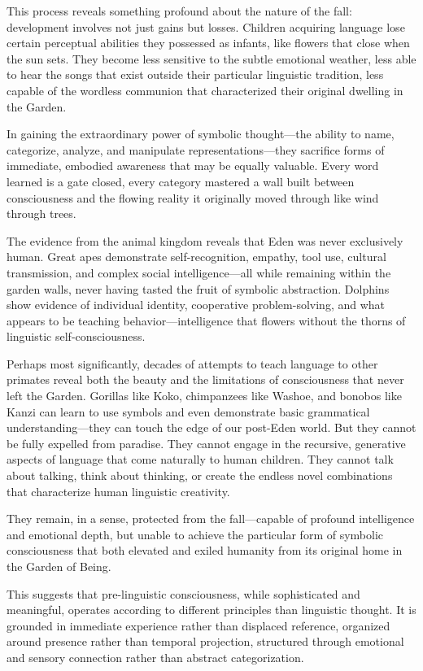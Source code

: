 This process reveals something profound about the nature of the fall: development involves not just gains but losses. Children acquiring language lose certain perceptual abilities they possessed as infants, like flowers that close when the sun sets. They become less sensitive to the subtle emotional weather, less able to hear the songs that exist outside their particular linguistic tradition, less capable of the wordless communion that characterized their original dwelling in the Garden.

In gaining the extraordinary power of symbolic thought—the ability to name, categorize, analyze, and manipulate representations—they sacrifice forms of immediate, embodied awareness that may be equally valuable. Every word learned is a gate closed, every category mastered a wall built between consciousness and the flowing reality it originally moved through like wind through trees.

The evidence from the animal kingdom reveals that Eden was never exclusively human. Great apes demonstrate self-recognition, empathy, tool use, cultural transmission, and complex social intelligence—all while remaining within the garden walls, never having tasted the fruit of symbolic abstraction. Dolphins show evidence of individual identity, cooperative problem-solving, and what appears to be teaching behavior—intelligence that flowers without the thorns of linguistic self-consciousness.

Perhaps most significantly, decades of attempts to teach language to other primates reveal both the beauty and the limitations of consciousness that never left the Garden. Gorillas like Koko, chimpanzees like Washoe, and bonobos like Kanzi can learn to use symbols and even demonstrate basic grammatical understanding—they can touch the edge of our post-Eden world. But they cannot be fully expelled from paradise. They cannot engage in the recursive, generative aspects of language that come naturally to human children. They cannot talk about talking, think about thinking, or create the endless novel combinations that characterize human linguistic creativity.

They remain, in a sense, protected from the fall—capable of profound intelligence and emotional depth, but unable to achieve the particular form of symbolic consciousness that both elevated and exiled humanity from its original home in the Garden of Being.

This suggests that pre-linguistic consciousness, while sophisticated and meaningful, operates according to different principles than linguistic thought. It is grounded in immediate experience rather than displaced reference, organized around presence rather than temporal projection, structured through emotional and sensory connection rather than abstract categorization.

